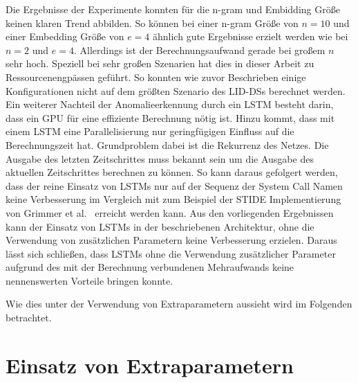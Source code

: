 Die Ergebnisse der Experimente konnten für die n-gram und Embidding Größe keinen klaren Trend abbilden.
So können bei einer n-gram Größe von $n=10$ und einer Embedding Größe von $e=4$ ähnlich gute Ergebnisse erzielt werden wie bei $n=2$ und $e=4$.
Allerdings ist der Berechnungsaufwand gerade bei großem $n$ sehr hoch.
Speziell bei sehr großen Szenarien hat dies in dieser Arbeit zu Ressourcenengpässen geführt.
So konnten wie zuvor Beschrieben einige Konfigurationen nicht auf dem größten Szenario des \acp{LID-DS} berechnet werden.
Ein weiterer Nachteil der Anomalieerkennung durch ein \ac{LSTM} besteht darin, dass ein GPU für eine effiziente Berechnung nötig ist.
Hinzu kommt, dass mit einem \ac{LSTM} eine Parallelisierung nur geringfügigen Einfluss auf die Berechnungszeit hat.
Grundproblem dabei ist die Rekurrenz des Netzes. 
Die Ausgabe des letzten Zeitschrittes muss bekannt sein um die Ausgabe des aktuellen Zeitschrittes berechnen zu können.
So kann daraus gefolgert werden, dass der reine Einsatz von \acp{LSTM} nur auf der Sequenz der System Call Namen keine Verbesserung im Vergleich mit zum Beispiel der \ac{STIDE} Implementierung von Grimmer et al.~\cite{IDSTHREADGRIMMER2021} erreicht werden kann.
Aus den vorliegenden Ergebnissen kann der Einsatz von \acp{LSTM} in der beschriebenen Architektur, ohne die Verwendung von zusätzlichen Parametern keine Verbesserung erzielen.
Daraus lässt sich schließen, dass \acp{LSTM} ohne die Verwendung zusätzlicher Parameter aufgrund des mit der Berechnung verbundenen Mehraufwands keine nennenswerten Vorteile bringen konnte.

Wie dies unter der Verwendung von Extraparametern aussieht wird im Folgenden betrachtet.

\section{Einsatz von Extraparametern}\label{sec:folgerungen_extra}

